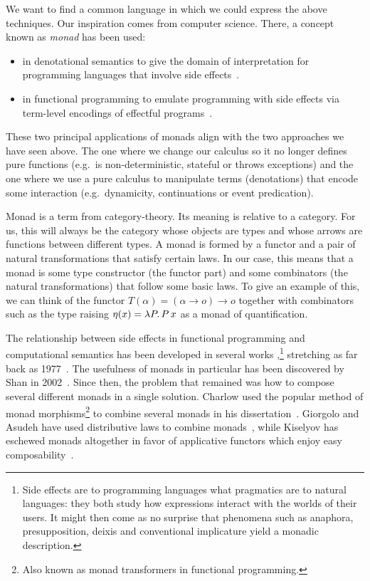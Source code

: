 \documentclass{llncs}
\begin{document}
We want to find a common language in which we could express the above
techniques. Our inspiration comes from computer science. There, a concept
known as \emph{monad} has been used:
\begin{itemize}
\item in denotational semantics to give the domain of interpretation for
  programming languages that involve side effects~\cite{moggi1991notions}.
\item in functional programming to emulate programming with side effects
  via term-level encodings of effectful programs~\cite{wadler1992essence}.
\end{itemize}
These two principal applications of monads align with the two approaches we
have seen above. The one where we change our calculus so it no longer
defines pure functions (e.g.\ is non-deterministic, stateful or throws
exceptions) and the one where we use a pure calculus to manipulate terms
(denotations) that encode some interaction (e.g.\ dynamicity, continuations
or event predication).

Monad is a term from category-theory. Its meaning is relative to a
category. For us, this will always be the category whose objects are types
and whose arrows are functions between different types. A monad is formed
by a functor and a pair of natural transformations that satisfy certain
laws. In our case, this means that a monad is some type constructor (the
functor part) and some combinators (the natural transformations) that
follow some basic laws. To give an example of this, we can think of the
functor $T(\alpha) = (\alpha \to o) \to o$ together with combinators such
as the type raising $\eta(x) = \lambda P.\, P\,x$ as a monad of
quantification.

The relationship between side effects in functional programming and
computational semantics has been developed in several works
\cite{shan2005thesis,van2010computational},\footnote{Side effects are
  to programming languages what pragmatics are to natural languages: they
  both study how expressions interact with the worlds of their users. It
  might then come as no surprise that phenomena such as anaphora,
  presupposition, deixis and conventional implicature yield a monadic
  description.} stretching as far back as 1977~\cite{hobbs1977making}. The
usefulness of monads in particular has been discovered by Shan in
2002~\cite{shan2002monads}. Since then, the problem that remained was how
to compose several different monads in a single solution. Charlow used the
popular method of monad morphisms\footnote{Also known as monad transformers
  in functional programming.} to combine several monads in his
dissertation~\cite{charlow2014semantics}. Giorgolo and Asudeh have used
distributive laws to combine monads~\cite{giorgolo2015natural}, while
Kiselyov has eschewed monads altogether in favor of applicative functors
which enjoy easy composability~\cite{kiselyov2015applicative}.
\end{document}
